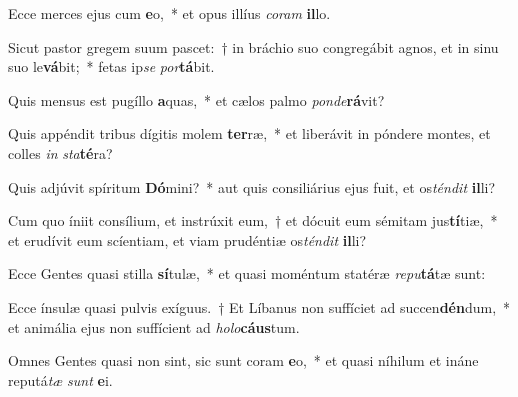 \item Ecce merces ejus cum \textbf{e}o,~* et opus illíus \textit{co}\textit{ram} \textbf{il}lo.
\item Sicut pastor gregem suum pascet:~† in bráchio suo congregábit agnos, et in sinu suo le\textbf{vá}bit;~* fetas ip\textit{se} \textit{por}\textbf{tá}bit.
\item Quis mensus est pugíllo \textbf{a}quas,~* et cælos palmo \textit{pon}\textit{de}\textbf{rá}vit?
\item Quis appéndit tribus dígitis molem \textbf{ter}ræ,~* et liberávit in póndere montes, et colles \textit{in} \textit{sta}\textbf{té}ra?
\item Quis adjúvit spíritum \textbf{Dó}mini?~* aut quis consiliárius ejus fuit, et os\textit{tén}\textit{dit} \textbf{il}li?
\item Cum quo íniit consílium, et instrúxit eum,~† et dócuit eum sémitam jus\textbf{tí}tiæ,~* et erudívit eum scíentiam, et viam prudéntiæ os\textit{tén}\textit{dit} \textbf{il}li?
\item Ecce Gentes quasi stilla \textbf{sí}tulæ,~* et quasi moméntum statéræ \textit{re}\textit{pu}\textbf{tá}tæ sunt:
\item Ecce ínsulæ quasi pulvis exíguus.~† Et Líbanus non suffíciet ad succen\textbf{dén}dum,~* et animália ejus non suffícient ad \textit{ho}\textit{lo}\textbf{cáus}tum.
\item Omnes Gentes quasi non sint, sic sunt coram \textbf{e}o,~* et quasi níhilum et ináne reputá\textit{tæ} \textit{sunt} \textbf{e}i.
